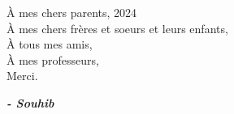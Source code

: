 
\begin{fquote}
\begin{center}
\large{

\uppercase{à} mes chers parents, 2024 \\[12pt]
\uppercase{à} mes chers frères et soeurs et leurs enfants,\\[12pt]
\uppercase{à} tous mes amis,\\[12pt]
\uppercase{à} mes professeurs,\\[12pt]
Merci.
}
\end{center}
\bigskip
\medskip
\end{fquote}

\begin{adjustwidth}{2cm}{1cm}
\hspace*{\fill} \textbf{\textit{\large{- Souhib}}}
\end{adjustwidth}

\clearpage
